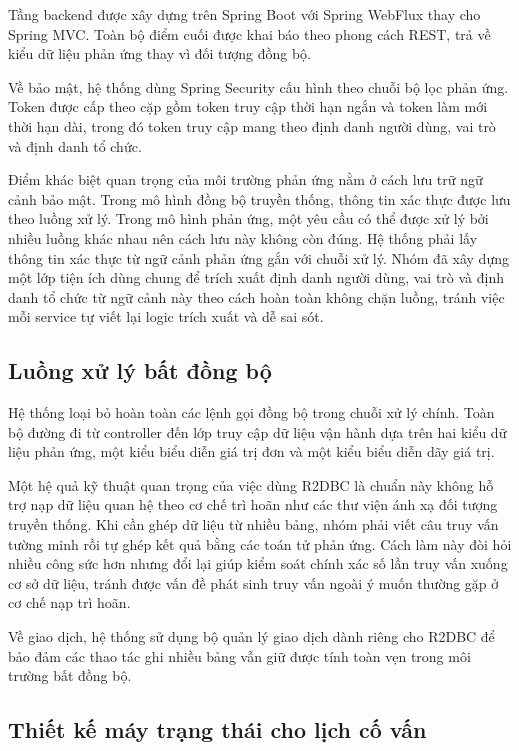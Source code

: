 \documentclass[12pt,a4paper,oneside]{report}
\begin{document}
Tầng backend được xây dựng trên Spring Boot với Spring WebFlux thay cho Spring MVC. Toàn bộ điểm cuối được khai báo theo phong cách REST, trả về kiểu dữ liệu phản ứng thay vì đối tượng đồng bộ.

Về bảo mật, hệ thống dùng Spring Security cấu hình theo chuỗi bộ lọc phản ứng. Token được cấp theo cặp gồm token truy cập thời hạn ngắn và token làm mới thời hạn dài, trong đó token truy cập mang theo định danh người dùng, vai trò và định danh tổ chức.

Điểm khác biệt quan trọng của môi trường phản ứng nằm ở cách lưu trữ ngữ cảnh bảo mật. Trong mô hình đồng bộ truyền thống, thông tin xác thực được lưu theo luồng xử lý. Trong mô hình phản ứng, một yêu cầu có thể được xử lý bởi nhiều luồng khác nhau nên cách lưu này không còn đúng. Hệ thống phải lấy thông tin xác thực từ ngữ cảnh phản ứng gắn với chuỗi xử lý. Nhóm đã xây dựng một lớp tiện ích dùng chung để trích xuất định danh người dùng, vai trò và định danh tổ chức từ ngữ cảnh này theo cách hoàn toàn không chặn luồng, tránh việc mỗi service tự viết lại logic trích xuất và dễ sai sót.

\subsection{Luồng xử lý bất đồng bộ}

Hệ thống loại bỏ hoàn toàn các lệnh gọi đồng bộ trong chuỗi xử lý chính. Toàn bộ đường đi từ controller đến lớp truy cập dữ liệu vận hành dựa trên hai kiểu dữ liệu phản ứng, một kiểu biểu diễn giá trị đơn và một kiểu biểu diễn dãy giá trị.

Một hệ quả kỹ thuật quan trọng của việc dùng R2DBC là chuẩn này không hỗ trợ nạp dữ liệu quan hệ theo cơ chế trì hoãn như các thư viện ánh xạ đối tượng truyền thống. Khi cần ghép dữ liệu từ nhiều bảng, nhóm phải viết câu truy vấn tường minh rồi tự ghép kết quả bằng các toán tử phản ứng. Cách làm này đòi hỏi nhiều công sức hơn nhưng đổi lại giúp kiểm soát chính xác số lần truy vấn xuống cơ sở dữ liệu, tránh được vấn đề phát sinh truy vấn ngoài ý muốn thường gặp ở cơ chế nạp trì hoãn.

Về giao dịch, hệ thống sử dụng bộ quản lý giao dịch dành riêng cho R2DBC để bảo đảm các thao tác ghi nhiều bảng vẫn giữ được tính toàn vẹn trong môi trường bất đồng bộ.

\subsection{Thiết kế máy trạng thái cho lịch cố vấn}
\end{document}
